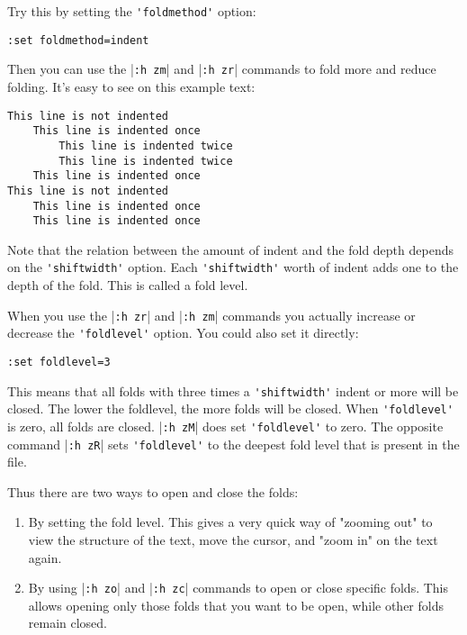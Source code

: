 Try this by setting the \verb!'foldmethod'! option:

\begin{Verbatim}[samepage=true]
 :set foldmethod=indent
\end{Verbatim}

Then you can use the |\verb!:h zm!| and |\verb!:h zr!| commands to fold more and reduce folding.
It's easy to see on this example text:

\begin{Verbatim}[samepage=true]
This line is not indented
    This line is indented once
        This line is indented twice
        This line is indented twice
    This line is indented once
This line is not indented
    This line is indented once
    This line is indented once
\end{Verbatim}

Note that the relation between the amount of indent and the fold depth depends on the \verb!'shiftwidth'! option.
Each \verb!'shiftwidth'! worth of indent adds one to the depth of the fold.
This is called a fold level.

When you use the |\verb!:h zr!| and |\verb!:h zm!| commands you actually increase or decrease the \verb!'foldlevel'! option.
You could also set it directly:

\begin{Verbatim}[samepage=true]
 :set foldlevel=3
\end{Verbatim}

This means that all folds with three times a \verb!'shiftwidth'! indent or more will be closed.
The lower the foldlevel, the more folds will be closed.
When \verb!'foldlevel'! is zero, all folds are closed.
|\verb!:h zM!| does set \verb!'foldlevel'! to zero.
The opposite command |\verb!:h zR!| sets \verb!'foldlevel'! to the deepest fold level that is present in the file.

Thus there are two ways to open and close the folds:
\begin{enumerate}
\item By setting the fold level.
This gives a very quick way of "zooming out" to view the structure of the text, move the cursor, and "zoom in" on the text again.

\item By using |\verb!:h zo!| and |\verb!:h zc!| commands to open or close specific folds.
This allows opening only those folds that you want to be open, while other folds remain closed.
\end{enumerate}


